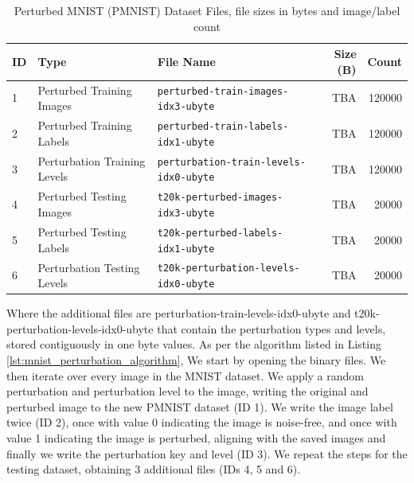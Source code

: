 \begin{table}[h]
\centering
{\small
\begin{tabular}{|l|l|l|r|r|}
\hline
\textbf{ID} & \textbf{Type}                   & \textbf{File Name}                                   & \textbf{Size (B)} & \textbf{Count} \\ \hline
1 & Perturbed Training Images       & \texttt{perturbed-train-images-idx3-ubyte}    & TBA               & 120000 \\
2 & Perturbed Training Labels       & \texttt{perturbed-train-labels-idx1-ubyte}    & TBA               & 120000 \\
3 & Perturbation Training Levels    & \texttt{perturbation-train-levels-idx0-ubyte} & TBA               & 120000 \\
4 & Perturbed Testing Images        & \texttt{t20k-perturbed-images-idx3-ubyte}     & TBA               & 20000 \\
5 & Perturbed Testing Labels        & \texttt{t20k-perturbed-labels-idx1-ubyte}     & TBA               & 20000 \\
6 & Perturbation Testing Levels     & \texttt{t20k-perturbation-levels-idx0-ubyte}  & TBA               & 20000 \\ \hline
\end{tabular}
} %
\caption{Perturbed MNIST (PMNIST) Dataset Files, file sizes in bytes and image/label count}
\label{table:mnist_perturbed_files_b}
\end{table}

Where the additional files are perturbation-train-levels-idx0-ubyte and t20k-perturbation-levels-idx0-ubyte that contain the perturbation types and levels, stored contiguously in one byte values. As per the algorithm listed in Listing \ref{lst:mnist_perturbation_algorithm}, We start by opening the binary files. We then iterate over every image in the MNIST dataset. We apply a random perturbation and perturbation level to the image, writing the original and perturbed image to the new PMNIST dataset (ID 1). We write the image label twice (ID 2), once with value 0 indicating the image is noise-free, and once with value 1 indicating the image is perturbed, aligning with the saved images and finally we write the perturbation key and level (ID 3). We repeat the steps for the testing dataset, obtaining 3 additional files (IDs 4, 5 and 6).







